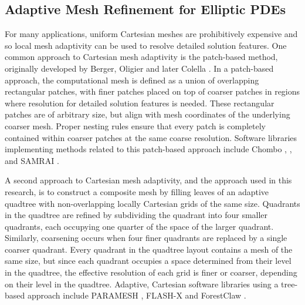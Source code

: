 \subsection{Adaptive Mesh Refinement for Elliptic PDEs}

For many applications, uniform Cartesian meshes are prohibitively expensive and so local mesh adaptivity can be used to resolve detailed solution features.  One common approach to Cartesian mesh adaptivity is the patch-based method, originally developed by Berger, Oligier and later Colella \citep{berger1989local,berger1984adaptive}. In a patch-based approach, the computational mesh is defined as a union of overlapping rectangular patches, with finer patches placed on top of coarser patches in regions where resolution for  detailed solution features is needed.  These rectangular patches are of arbitrary size, but align with mesh coordinates of the underlying coarser mesh. Proper nesting rules ensure that every patch is completely contained within coarser patches at the same coarse resolution. Software libraries implementing methods related to this patch-based approach include Chombo \citep{colella2009chombo}, \amrex \citep{zhang2019amrex}, and SAMRAI \citep{hornung2006managing}.

A second approach to Cartesian mesh adaptivity, and the approach used in this research, is to construct a composite mesh by filling leaves of an adaptive quadtree with non-overlapping locally Cartesian grids of the same size. Quadrants in the quadtree are refined by subdividing the quadrant into four smaller quadrants, each occupying one quarter of the space of the larger quadrant. Similarly, coarsening occurs when four finer quadrants are replaced by a single coarser quadrant.  Every quadrant in the quadtree layout contains a mesh of the same size, but since each quadrant occupies a space determined from their level in the quadtree, the effective resolution of each grid is finer or coarser, depending on their level in the quadtree.  Adaptive, Cartesian software libraries using a tree-based approach include PARAMESH \citep{globisch1995parmesh}, FLASH-X \citep{dubey2022flash} and ForestClaw \citep{calhoun2017forestclaw}.


